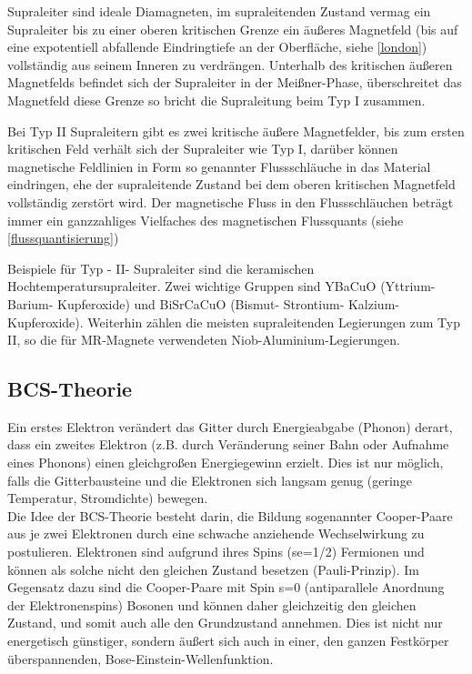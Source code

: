 \documentclass[12pt]{article}
\begin{document}
Supraleiter sind ideale Diamagneten, im supraleitenden Zustand vermag ein Supraleiter bis zu einer oberen kritischen Grenze ein äußeres Magnetfeld (bis auf eine expotentiell abfallende Eindringtiefe an der Oberfläche, siehe \ref{london}) vollständig aus seinem Inneren zu verdrängen. Unterhalb des kritischen äußeren Magnetfelds befindet sich der Supraleiter in der Meißner-Phase, überschreitet das Magnetfeld diese Grenze so bricht die Supraleitung beim Typ I zusammen.

Bei Typ II Supraleitern gibt es zwei kritische äußere Magnetfelder, bis zum ersten kritischen Feld verhält sich der Supraleiter wie Typ I, darüber können magnetische Feldlinien in Form so genannter Flussschläuche in das Material eindringen, ehe der supraleitende Zustand bei dem oberen kritischen Magnetfeld vollständig zerstört wird. Der magnetische Fluss in den Flussschläuchen beträgt immer ein ganzzahliges Vielfaches des magnetischen Flussquants (siehe \ref{flussquantisierung})

Beispiele für Typ - II- Supraleiter sind die keramischen Hochtemperatursupraleiter. Zwei wichtige Gruppen sind YBaCuO (Yttrium- Barium- Kupferoxide) und BiSrCaCuO (Bismut- Strontium- Kalzium- Kupferoxide). Weiterhin zählen die meisten supraleitenden Legierungen zum Typ II, so die für MR-Magnete verwendeten Niob-Aluminium-Legierungen.

\subsection{BCS-Theorie}
\label{bcs}
Ein erstes Elektron verändert das Gitter durch Energieabgabe (Phonon) derart, dass ein zweites Elektron (z.B. durch Veränderung seiner Bahn oder Aufnahme eines Phonons) einen gleichgroßen Energiegewinn erzielt. Dies ist nur möglich, falls die Gitterbausteine und die Elektronen sich langsam genug (geringe  Temperatur, Stromdichte) bewegen.\\

Die Idee der BCS-Theorie besteht darin, die Bildung sogenannter Cooper-Paare aus je zwei Elektronen durch eine schwache anziehende Wechselwirkung zu postulieren. Elektronen sind aufgrund ihres Spins (se=1/2) Fermionen und können als solche nicht den gleichen Zustand besetzen (Pauli-Prinzip). Im Gegensatz dazu sind die Cooper-Paare mit Spin s=0 (antiparallele Anordnung der Elektronenspins) Bosonen und können daher gleichzeitig den gleichen Zustand, und somit auch alle den Grundzustand annehmen. Dies ist nicht nur energetisch günstiger, sondern äußert sich auch in einer, den ganzen Festkörper überspannenden, Bose-Einstein-Wellenfunktion.\\
\end{document}
